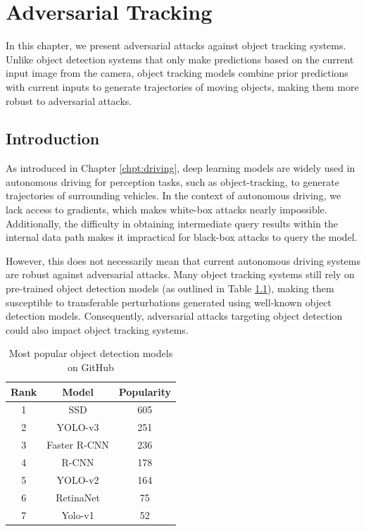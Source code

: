 \chapter{Adversarial Tracking}
\label{chpt:tracking}


In this chapter, we present adversarial attacks against object tracking systems. Unlike object detection systems that only make predictions based on the current input image from the camera, object tracking models combine prior predictions with current inputs to generate trajectories of moving objects, making them more robust to adversarial attacks.

\section{Introduction}
\label{sec:adv_track}

As introduced in Chapter \ref{chpt:driving}, deep learning models are widely used in autonomous driving for perception tasks, such as object-tracking, to generate trajectories of surrounding vehicles. In the context of autonomous driving, we lack access to gradients, which makes white-box attacks nearly impossible. Additionally, the difficulty in obtaining intermediate query results within the internal data path makes it impractical for black-box attacks to query the model.

However, this does not necessarily mean that current autonomous driving systems are robust against adversarial attacks. Many object tracking systems still rely on pre-trained object detection models (as outlined in Table \ref{tab.detection_github}), making them susceptible to transferable perturbations generated using well-known object detection models. Consequently, adversarial attacks targeting object detection could also impact object tracking systems.

\begin{table}[H]
\centering
\begin{tabular}{ ccc } 
\hline
Rank & Model & Popularity \\
\hline
1 & SSD & 605 \\ 
2 & YOLO-v3 & 251 \\ 
3 & Faster R-CNN & 236 \\ 
4 & R-CNN & 178 \\ 
5 & YOLO-v2 & 164 \\ 
6 & RetinaNet & 75 \\ 
7 & Yolo-v1 & 52 \\ 
\hline
\end{tabular}
\caption{Most popular object detection models on GitHub \citep{wang2021daedalus}}
\label{tab.detection_github}
\end{table}

